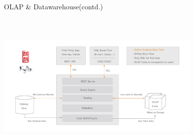 \documentclass{beamer}
\begin{document}
\begin{frame}{OLAP \& Datawarehouse(contd.)}
		\includegraphics[width=10cm,height=8cm]{ppt_figures/kylin_diagram.png}
\end{frame}
\end{document}
